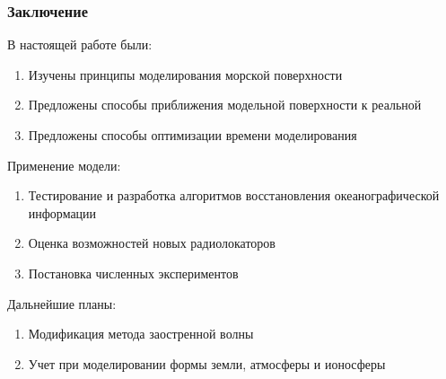 \documentclass[10pt,pdf,hyperref={unicode}, dvipsnames]{beamer}
\begin{document}
\begin{frame}[t]
	\frametitle{Заключение}
	\vfill
    В настоящей работе были:
		\begin{enumerate}
			\item Изучены принципы моделирования морской поверхности

			\item Предложены способы приближения модельной поверхности к
                реальной

			\item Предложены способы оптимизации времени моделирования
		\end{enumerate}
		\vfill

    Применение модели:

	\begin{enumerate}
		\item Тестирование и разработка алгоритмов восстановления океанографической информации
		\item Оценка возможностей новых радиолокаторов
		\item Постановка численных экспериментов
	\end{enumerate}
	\vfill

    Дальнейшие планы: 
	\begin{enumerate}
		\item Модификация метода заостренной волны
        \item Учет при моделировании формы земли, атмосферы и ионосферы
	\end{enumerate}
	\vfill
    
\end{frame}
\end{document}

